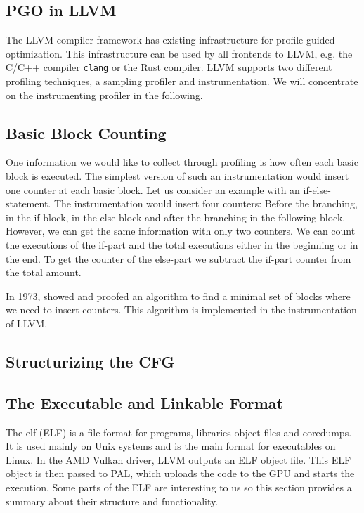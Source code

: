 \subsection{PGO in LLVM}
\label{sub:pgo-background}
The LLVM compiler framework has existing infrastructure for profile-guided optimization. This infrastructure can be used by all frontends to LLVM, e.g. the C/C++ compiler \texttt{clang} or the Rust compiler. LLVM supports two different profiling techniques, a sampling profiler and instrumentation. We will concentrate on the instrumenting profiler in the following.

\subsection{Basic Block Counting}
\label{sub:counter-instrumentation}
One information we would like to collect through profiling is how often each basic block is executed. The simplest version of such an instrumentation would insert one counter at each basic block.
Let us consider an example with an if-else-statement. The instrumentation would insert four counters: Before the branching, in the if-block, in the else-block and after the branching in the following block. However, we can get the same information with only two counters. We can count the executions of the if-part and the total executions either in the beginning or in the end. To get the counter of the else-part we subtract the if-part counter from the total amount.

In 1973, \citet{Knuth1973} showed and proofed an algorithm to find a minimal set of blocks where we need to insert counters. This algorithm is implemented in the instrumentation of LLVM.

\subsection{Structurizing the CFG}
\label{sub:structurize}

\subsection{The Executable and Linkable Format}
\label{sub:elf}
The \glsdesc{elf} (ELF) is a file format for programs, libraries object files and coredumps. It is used mainly on Unix systems and is the main format for executables on Linux.
In the AMD Vulkan driver, LLVM outputs an ELF object file. This ELF object is then passed to PAL, which uploads the code to the GPU and starts the execution. Some parts of the ELF are interesting to us so this section provides a summary about their structure and functionality.

